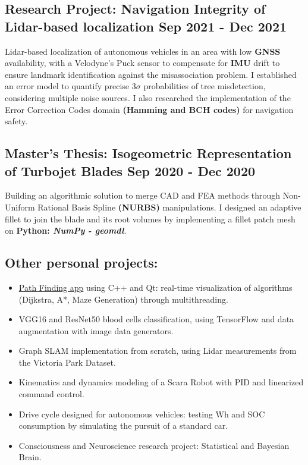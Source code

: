 \documentclass[]{article}
\begin{document}
\subsection{{Research Project: Navigation Integrity of Lidar-based localization \hfill \small{Sep 2021 - Dec 2021}}}

\vspace{2ex}

Lidar-based localization of autonomous vehicles in an area with low \textbf{GNSS} availability, with a Velodyne's Puck sensor to compensate for \textbf{IMU} drift to ensure landmark identification against the misassociation problem.
I established an error model to quantify precise $3\sigma $ probabilities of tree misdetection, considering multiple noise sources. 
I also researched the implementation of the Error Correction Codes domain \textbf{(Hamming and BCH codes)} for navigation safety.\\


\subsection{{Master's Thesis: Isogeometric Representation of Turbojet Blades  \hfill \small{Sep 2020 - Dec 2020}}}
 
\vspace{2ex}

Building an algorithmic solution to merge CAD and FEA methods through Non-Uniform Rational Basis Spline \textbf{(NURBS)} manipulations. 
I designed an adaptive fillet to join the blade and its root volumes by implementing a fillet patch mesh on \textbf{Python: \textit{NumPy - geomdl}}.

\vspace{2ex}

\subsection{Other personal projects:} 
\begin{itemize}
    \item \href{https://github.com/NathanTouboul/PathPlanning}{Path Finding app}  using C++ and Qt: real-time visualization of algorithms (Dijkstra, A*, Maze Generation) through multithreading.
    \item VGG16 and ResNet50 blood cells classification, using TensorFlow and data augmentation with image data generators.
    \item Graph SLAM implementation from scratch, using Lidar measurements from the Victoria Park Dataset.
    \item Kinematics and dynamics modeling of a Scara Robot with PID and linearized command control.
    \item Drive cycle designed for autonomous vehicles: testing Wh and SOC consumption by simulating the pursuit of a standard car.
    \item Consciousness and Neuroscience research project: Statistical and Bayesian Brain.
\end{itemize}
\end{document}
